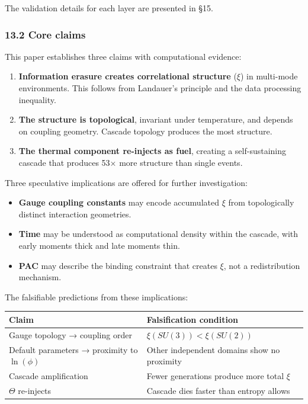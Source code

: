 \documentclass[
  11pt,
  a4paper]{article}
\providecommand{\tightlist}{%
  \setlength{\itemsep}{0pt}\setlength{\parskip}{0pt}}
\begin{document}
The validation details for each layer are presented in §15.

\subsubsection{13.2 Core claims}\label{core-claims}

This paper establishes three claims with computational evidence:

\begin{enumerate}
\def\labelenumi{\arabic{enumi}.}
\item
  \textbf{Information erasure creates correlational structure} (\(\xi\))
  in multi-mode environments. This follows from Landauer's principle and
  the data processing inequality.
\item
  \textbf{The structure is topological}, invariant under temperature,
  and depends on coupling geometry. Cascade topology produces the most
  structure.
\item
  \textbf{The thermal component re-injects as fuel}, creating a
  self-sustaining cascade that produces 53× more structure than single
  events.
\end{enumerate}

Three speculative implications are offered for further investigation:

\begin{itemize}
\tightlist
\item
  \textbf{Gauge coupling constants} may encode accumulated \(\xi\) from
  topologically distinct interaction geometries.
\item
  \textbf{Time} may be understood as computational density within the
  cascade, with early moments thick and late moments thin.
\item
  \textbf{PAC} may describe the binding constraint that creates \(\xi\),
  not a redistribution mechanism.
\end{itemize}

The falsifiable predictions from these implications:

\begin{longtable}[]{@{}
  >{\raggedright\arraybackslash}p{}
  >{\raggedright\arraybackslash}p{}@{}}
\toprule\noalign{}
\begin{minipage}[b]{\linewidth}\raggedright
Claim
\end{minipage} & \begin{minipage}[b]{\linewidth}\raggedright
Falsification condition
\end{minipage} \\
\midrule\noalign{}
\endhead
\bottomrule\noalign{}
\endlastfoot
Gauge topology → coupling order & \(\xi(SU(3)) < \xi(SU(2))\) \\
Default parameters → proximity to \(\ln(\phi)\) & Other independent
domains show no proximity \\
Cascade amplification & Fewer generations produce more total \(\xi\) \\
\(\Theta\) re-injects & Cascade dies faster than entropy allows \\
\end{longtable}
\end{document}

